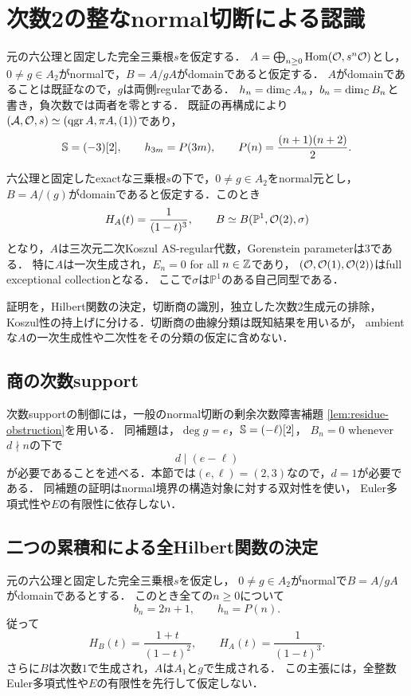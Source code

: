 \documentclass[11pt,a4paper]{ltjsarticle}
\begin{document}
\section{次数2の整なnormal切断による認識}
\label{sec:degree2-hilbert}

元の六公理と固定した完全三乗根$s$を仮定する．
$A=\bigoplus_{n\geq0}\operatorname{Hom}(\mathcal O,s^n\mathcal O)$とし，
$0\ne g\in A_2$がnormalで，$B=A/gA$がdomainであると仮定する．
$A$がdomainであることは既証なので，$g$は両側regularである．
$h_n=\dim_\mathbb C A_n$，$b_n=\dim_\mathbb C B_n$と書き，負次数では両者を零とする．
既証の再構成により$(\mathcal A,\mathcal O,s)\simeq(\operatorname{qgr} A,\pi A,(1))$であり，
\[
 \mathbb S=(-3)[2],\qquad h_{3m}=P(3m),\qquad
 P(n)=\frac{(n+1)(n+2)}2.
\]


\begin{theorem}[次数2の整なnormal切断による認識]
\label{thm:quadratic-normal-recognition}
六公理と固定したexactな三乗根$s$の下で，$0\ne g\in A_2$をnormal元とし，
$B=A/(g)$がdomainであると仮定する．このとき
\[
 H_A(t)=\frac1{(1-t)^3},\qquad
 B\simeq B(\mathbb P^1,\mathcal O(2),\sigma)
\]
となり，$A$は三次元二次Koszul AS-regular代数，Gorenstein parameterは3である．
特に$A$は一次生成され，$E_n=0$ for all $n\in\mathbb Z$であり，
$(\mathcal O,\mathcal O(1),\mathcal O(2))$はfull exceptional collectionとなる．
ここで$\sigma$は$\mathbb P^1$のある自己同型である．
\end{theorem}

証明を，Hilbert関数の決定，切断商の識別，独立した次数2生成元の排除，
Koszul性の持上げに分ける．切断商の曲線分類は既知結果を用いるが，
ambientな$A$の一次生成性や二次性をその分類の仮定に含めない．

\subsection{商の次数support}

次数supportの制御には，一般のnormal切断の剰余次数障害補題
\ref{lem:residue-obstruction}を用いる．
同補題は，$\deg g=e$，$\mathbb S=(-\ell)[2]$，
$B_n=0$ whenever $d\nmid n$の下で
\[
 d\mid(e-\ell)
\]
が必要であることを述べる．本節では$(e,\ell)=(2,3)$なので，$d=1$が必要である．
同補題の証明はnormal境界の構造対象に対する双対性を使い，
Euler多項式性や$E$の有限性に依存しない．

\subsection{二つの累積和による全Hilbert関数の決定}

\begin{theorem}[二次の整なnormal切断のHilbert関数]
\label{thm:degree2-hilbert}
元の六公理と固定した完全三乗根$s$を仮定し，
$0\ne g\in A_2$がnormalで$B=A/gA$がdomainであるとする．
このとき全ての$n\geq0$について
\[
 \boxed{\quad b_n=2n+1,\qquad h_n=P(n).\quad}
\]
従って
\[
 H_B(t)=\frac{1+t}{(1-t)^2},\qquad H_A(t)=\frac1{(1-t)^3}.
\]
さらに$B$は次数$1$で生成され，$A$は$A_1$と$g$で生成される．
この主張には，全整数Euler多項式性や$E$の有限性を先行して仮定しない．
\end{theorem}
\end{document}
